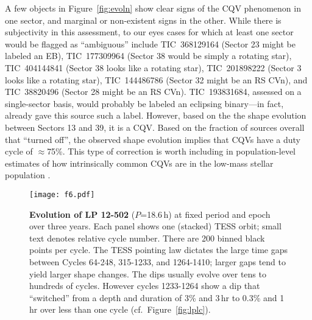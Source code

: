 \documentclass[11pt,twocolumn,tighten]{aastex63}
\begin{document}
A few objects in Figure~\ref{fig:evoln}
show clear signs of
the CQV phenomenon in one sector, and marginal or non-existent signs
in the other.  While there is subjectivity in this assessment, to our
eyes cases for which at least one sector would be flagged as
``ambiguous'' include
TIC~368129164 (Sector 23 might be labeled an EB),
TIC~177309964 (Sector 38 would be simply a rotating star),
TIC~404144841 (Sector 38 looks like a rotating star),
TIC~201898222 (Sector 3 looks like a rotating star),
TIC~144486786 (Sector 32 might be an RS CVn),
and
TIC~38820496 (Sector 28 might be an RS CVn).
TIC~193831684, assessed on a single-sector basis, would probably be
labeled an eclipsing binary---in fact, \citet{2021ApJ...912..123J}
already gave this source such a label.  However,
based on the the shape evolution between Sectors 13 and 39, it is a
CQV.  Based on the fraction of sources overall that ``turned off'',
the observed shape evolution implies that CQVs have a duty cycle of
$\approx$75\%.  This type of correction is worth including in
population-level estimates of how intrinsically common CQVs are in the
low-mass stellar population \citep[e.g.][]{2022AJ....163..144G}.



\begin{figure*}[!t]
	\begin{center}
		\centering
		\texttt{[image: f6.pdf]}
		\vspace{-0.3cm}
		\caption{
			{\bf Evolution of LP 12-502} ($P$=18.6\,h) at fixed period and
			epoch over three years.  Each panel shows one (stacked) TESS
			orbit; small text denotes relative cycle number.  There are 200
			binned black points per cycle.  The TESS pointing law dictates
			the large time gaps between Cycles 64-248, 315-1233, and
			1264-1410; larger gaps tend to yield larger shape changes.  The
			dips usually evolve over tens to hundreds of cycles.  However
			cycles 1233-1264 show a dip that ``switched'' from a depth and
			duration of 3\% and 3\,hr to 0.3\% and 1\,hr over less than one
			cycle (cf.~Figure~\ref{fig:lplc}).
		}
		\label{fig:lp}
	\end{center}
\end{figure*}

\end{document}
